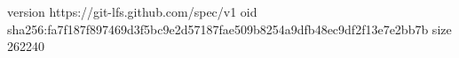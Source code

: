 version https://git-lfs.github.com/spec/v1
oid sha256:fa7f187f897469d3f5bc9e2d57187fae509b8254a9dfb48ec9df2f13e7e2bb7b
size 262240

